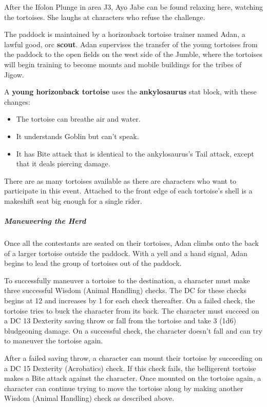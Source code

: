\documentclass[10pt,a4paper,twoside,bg=print,twocolumn,openany,nodeprecatedcode]{dndbook}
\begin{document}
After the Ifolon Plunge in area J3, Ayo Jabe can be found relaxing here, watching the tortoises. She laughs at characters who refuse the challenge.

The paddock is maintained by a horizonback tortoise trainer named Adan, a lawful good, orc \textbf{scout}. Adan supervises the transfer of the young tortoises from the paddock to the open fields on the west side of the Jumble, where the tortoises will begin training to become mounts and mobile buildings for the tribes of Jigow.

A \textbf{young horizonback tortoise} uses the \textbf{ankylosaurus} stat block, with these changes:


\begin{itemize}
\item The tortoise can breathe air and water.
\item It understands Goblin but can't speak.
\item It has Bite attack that is identical to the ankylosaurus's Tail attack, except that it deals piercing damage.
\end{itemize}

There are as many tortoises available as there are characters who want to participate in this event. Attached to the front edge of each tortoise's shell is a makeshift seat big enough for a single rider.

\subparagraph{Maneuvering the Herd}
Once all the contestants are seated on their tortoises, Adan climbs onto the back of a larger tortoise outside the paddock. With a yell and a hand signal, Adan begins to lead the group of tortoises out of the paddock.

To successfully maneuver a tortoise to the destination, a character must make three successful Wisdom (Animal Handling) checks. The DC for these checks begins at 12 and increases by 1 for each check thereafter. On a failed check, the tortoise tries to buck the character from its back. The character must succeed on a DC 13 Dexterity saving throw or fall from the tortoise and take 3 (1d6) bludgeoning damage. On a successful check, the character doesn't fall and can try to maneuver the tortoise again.

After a failed saving throw, a character can mount their tortoise by succeeding on a DC 15 Dexterity (Acrobatics) check. If this check fails, the belligerent tortoise makes a Bite attack against the character. Once mounted on the tortoise again, a character can continue trying to move the tortoise along by making another Wisdom (Animal Handling) check as described above.
\end{document}

